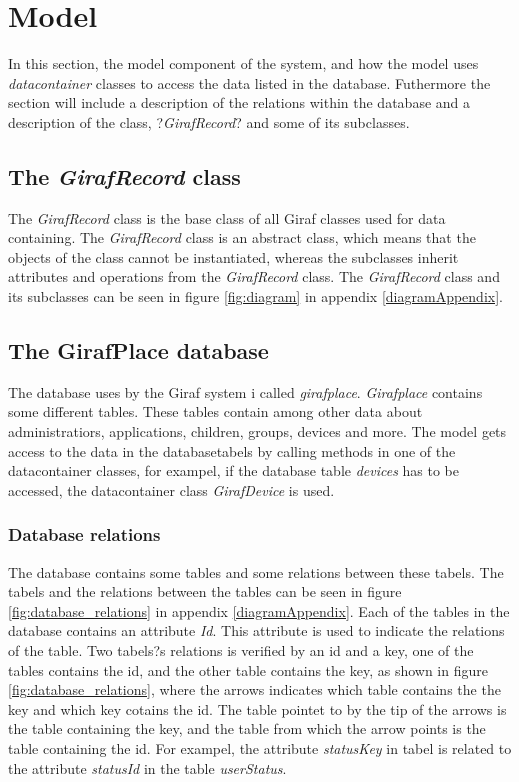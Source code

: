 \section{Model}
\label{model}

In this section, the model component of the system, and how the model uses \textit{datacontainer} classes to access the data listed in the database. Futhermore the section will include a description of the relations within the database and a description of the class, ?\textit{GirafRecord}? and some of its subclasses.

\subsection{The \textit{GirafRecord} class}
The \textit{GirafRecord} class is the base class of all Giraf classes used for data containing. The \textit{GirafRecord} class is an abstract class, which means that the objects of the class cannot be instantiated, whereas the subclasses inherit attributes and operations from the \textit{GirafRecord} class. The \textit{GirafRecord} class and its subclasses can be seen in figure \ref{fig:diagram} in appendix \ref{diagramAppendix}.

\subsection{The GirafPlace database}
The database uses by the Giraf system i called \textit{girafplace}. \textit{Girafplace} contains some different tables. These tables contain among other data about administratiors, applications, children, groups, devices and more.
The model gets access to the data in the databasetabels by calling methods in one of the datacontainer classes, for exampel, if the database table \textit{devices} has to be accessed, the datacontainer class \textit{GirafDevice} is used.

\subsubsection{Database relations}
The database contains some tables and some relations between these tabels. The tabels and the relations between the tables can be seen in figure \ref{fig:database_relations} in appendix \ref{diagramAppendix}.
Each of the tables in the database contains an attribute \textit{Id}. This attribute is used to indicate the relations of the table. Two tabels?s relations is verified by an id and a key, one of the tables contains the id, and the other table contains the key, as shown in figure \ref{fig:database_relations}, where the arrows indicates which table contains the the key and which key cotains the id. The table pointet to by the tip of the arrows is the table containing the key, and the table from which the arrow points is the table containing the id. 
For exampel, the attribute  \textit{statusKey} in tabel  is related to the attribute \textit{statusId} in the table \textit{userStatus}.